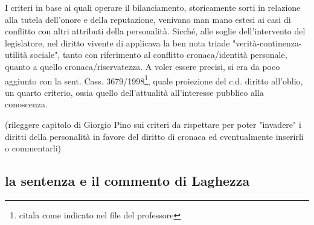 I criteri in base ai quali operare il bilanciamento, storicamente sorti in relazione alla tutela dell'onore e della reputazione, venivano man mano estesi ai casi di conflitto con altri attributi della personalità. Sicché, alle soglie dell'intervento del legislatore, nel diritto vivente di applicava la ben nota triade "verità-continenza-utilità sociale", tanto con riferimento al conflitto cronaca/identità personale, quanto a quello cronaca/riservatezza.
A voler essere precisi, si era da poco aggiunto con la sent. Cass. 3679/1998\footnote{citala come indicato nel file del professore}, quale proiezione del c.d. diritto all'oblio, un quarto criterio, ossia quello dell'attualità all'interesse pubblico alla conoscenza.


(rileggere capitolo di Giorgio Pino sui criteri da rispettare per poter "invadere" i diritti della personalità in favore del diritto di cronaca ed eventualmente inserirli o commentarli)

\subsection{la sentenza e il commento di Laghezza}

